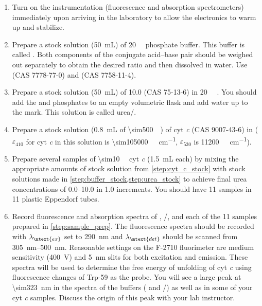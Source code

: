 \begin{enumerate}
	\item Turn on the instrumentation (fluorescence and absorption spectrometers) immediately upon arriving in the laboratory to allow the electronics to warm up and stabilize. 
	\item Prepare a stock solution (\qty{50}{\mL}) of \qty{20}{\milli\Molar}  phosphate buffer. 
	This buffer is called . 
	Both components of the conjugate acid--base pair should be weighed out separately to obtain the desired ratio and then dissolved in water. 
	Use  (CAS 7778-77-0) and  (CAS 7758-11-4).
	\label{step:buffer_stock}
	\item Prepare a stock solution (\qty{50}{\mL}) of \qty{10.0}{\Molar}  (CAS 75-13-6) in \qty{20}{\milli\Molar} . 
	You should add the  and phosphates to an empty volumetric flask and add water up to the mark. 
	This solution is called urea/. 
	\label{step:urea_stock}
	\item Prepare a stock solution (\qty{0.8}{\mL} of \qty{\sim500}{\micro\Molar}) of cyt \emph{c} (CAS 9007-43-6) in  (\( \varepsilon_{410} \) for cyt \emph{c} in this solution is \qty{\sim105000}{\per\Molar\per\cm}, \( \varepsilon_{530} \) is \qty{11200}{\per\Molar\per\cm}).
	\label{step:cyt_c_stock}
	\item Prepare several samples of \qty{\sim10}{\micro\Molar} cyt \emph{c} (\qty{1.5}{\mL} each) by mixing the appropriate amounts of stock solution from \cref{step:cyt_c_stock} with stock solutions made in \cref{step:buffer_stock,step:urea_stock} to achieve final urea concentrations of \SIrange{0.0}{10.0}{\Molar} in \qty{1.0}{\Molar} increments. 
	You should have \num{11} samples in \num{11} plastic Eppendorf tubes.
	\label{step:sample_prep}
	\item Record fluorescence and absorption spectra of , /, and each of the \num{11} samples prepared in \cref{step:sample_prep}. 
	The fluorescence spectra should be recorded with \( \lambda_\mtext{ex} \) set to \qty{290}{\nm} and \( \lambda_\mtext{det} \) should be scanned from \SIrange{305}{500}{\nm}. 
	Reasonable settings on the F-2710 fluorimeter are medium sensitivity (\qty{400}{\V}) and \qty{5}{\nm} slits for both excitation and emission. 
	These spectra will be used to determine the free energy of unfolding of cyt \emph{c} using fluorescence changes of Trp-59 as the probe. 
	You will see a large peak at \qty{\sim323}{\nm} in the spectra of the buffers ( and /) as well as in some of your cyt \emph{c} samples. 
	Discuss the origin of this peak with your lab instructor. 
	\label{step:fluor_spec}
\end{enumerate}

